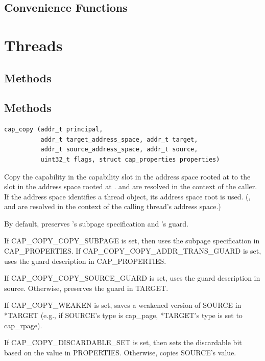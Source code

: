 \subsection{Convenience Functions}

\clearpage
\section{Threads}

\subsection{Methods}

\subsection{Methods}

\begin{lstlisting}
cap_copy (addr_t principal,
          addr_t target_address_space, addr_t target,
          addr_t source_address_space, addr_t source,
          uint32_t flags, struct cap_properties properties)
\end{lstlisting}

Copy the capability in the capability slot  in the address
space rooted at  to the slot 
in the address space rooted at .
 and  are
resolved in the context of the caller.  If the address space
identifies a thread object, its address space root is used.
(,  and
 are resolved in the context of the
calling thread's address space.)

By default, preserves 's subpage specification and
's guard.

If CAP\_COPY\_COPY\_SUBPAGE is set, then uses the subpage
specification in CAP\_PROPERTIES.  If CAP\_COPY\_COPY\_ADDR\_TRANS\_GUARD
is set, uses the guard description in CAP\_PROPERTIES.

If CAP\_COPY\_COPY\_SOURCE\_GUARD is set, uses the guard description in
source.  Otherwise, preserves the guard in TARGET.

If CAP\_COPY\_WEAKEN is set, saves a weakened version of SOURCE in
*TARGET (e.g., if SOURCE's type is cap\_page, *TARGET's type is set
to cap\_rpage).

If CAP\_COPY\_DISCARDABLE\_SET is set, then sets the discardable bit
based on the value in PROPERTIES.  Otherwise, copies SOURCE's
value.

